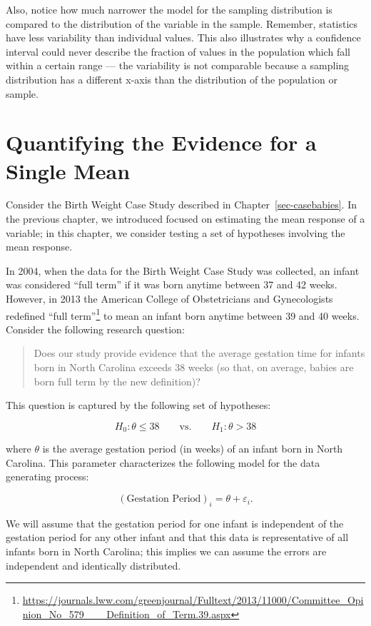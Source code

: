 \documentclass[
  letterpaper,
  DIV=11,
  numbers=noendperiod]{scrreprt}
\theoremstyle{plain}
\theoremstyle{definition}
\theoremstyle{definition}
\theoremstyle{remark}
\begin{document}
Also, notice how much narrower the model for the sampling distribution
is compared to the distribution of the variable in the sample. Remember,
statistics have less variability than individual values. This also
illustrates why a confidence interval could never describe the fraction
of values in the population which fall within a certain range --- the
variability is not comparable because a sampling distribution has a
different x-axis than the distribution of the population or sample.

\chapter{Quantifying the Evidence for a Single Mean}\label{sec-teststat}

Consider the Birth Weight Case Study described in
Chapter~\ref{sec-casebabies}. In the previous chapter, we introduced
focused on estimating the mean response of a variable; in this chapter,
we consider testing a set of hypotheses involving the mean response.

In 2004, when the data for the Birth Weight Case Study was collected, an
infant was considered ``full term'' if it was born anytime between 37
and 42 weeks. However, in 2013 the American College of Obstetricians and
Gynecologists redefined ``full term''\footnote{\url{https://journals.lww.com/greenjournal/Fulltext/2013/11000/Committee_Opinion_No_579___Definition_of_Term.39.aspx}}
to mean an infant born anytime between 39 and 40 weeks. Consider the
following research question:

\begin{quote}
Does our study provide evidence that the average gestation time for
infants born in North Carolina exceeds 38 weeks (so that, on average,
babies are born full term by the new definition)?
\end{quote}

This question is captured by the following set of hypotheses:

\[H_0: \theta \leq 38 \qquad \text{vs.} \qquad H_1: \theta > 38\]

where \(\theta\) is the average gestation period (in weeks) of an infant
born in North Carolina. This parameter characterizes the following model
for the data generating process:

\[(\text{Gestation Period})_i = \theta + \varepsilon_i.\]

We will assume that the gestation period for one infant is independent
of the gestation period for any other infant and that this data is
representative of all infants born in North Carolina; this implies we
can assume the errors are independent and identically distributed.
\end{document}
